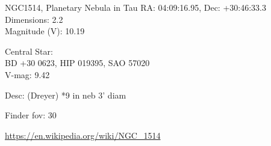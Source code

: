 \begin{block}{NGC1514, Planetary Nebula in Tau}
    RA: 04:09:16.95, Dec: +30:46:33.3 \\ 
    Dimensions: 2.2 \\ 
    Magnitude (V): 10.19

    Central Star: \\ 
      \hspace{1em}BD +30 0623, HIP 019395, SAO 57020 \\ 
      \hspace{1em}V-mag: 9.42 

    Desc: (Dreyer) *9 in neb 3' diam 

    Finder fov: 30 

    \url{https://en.wikipedia.org/wiki/NGC_1514} 
\end{block}